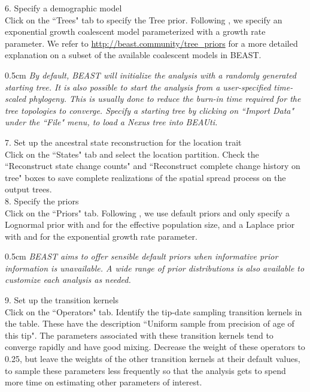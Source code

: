 \documentclass{article}
\newcommand{\ann}[1]{
\begin{adjustwidth}{0.5cm}{}
\it{#1}\\
\end{adjustwidth}}
\newcommand{\code}[1]{
{\upshape\ttfamily{#1}}}
\begin{document}
6. Specify a demographic model\\

Click on the ``Trees" tab to specify the Tree prior. Following \cite{travhist}, %
we specify an exponential growth coalescent model parameterized with a growth rate parameter.
We refer to \url{http://beast.community/tree_priors} for a more detailed explanation on a subset of the available coalescent models in BEAST. \\

\ann{By default, BEAST will initialize the analysis with a randomly generated starting tree. It is also possible to start the analysis from a user-specified time-scaled phylogeny. This is usually done to reduce the burn-in time required for the tree topologies to converge. Specify a starting tree by clicking on ``Import Data" under the ``File" menu, to load a Nexus tree into BEAUti.}

7. Set up the ancestral state reconstruction for the location trait\\

Click on the ``States" tab and select the location partition. Check the ``Reconstruct state change counts" and ``Reconstruct complete change history on tree" boxes to save complete realizations of the spatial spread process on the output trees.\\

8. Specify the priors \\

Click on the ``Priors" tab. Following \cite{travhist}, %
we use default priors and only specify a Lognormal prior with \code{mu=0} and \code{sigma=10} for the effective population size, and a Laplace prior with \code{mean=0} and \code{scale=100} for the exponential growth rate parameter.\\

\ann{BEAST aims to offer sensible default priors when informative prior information is unavailable. A wide range of prior distributions is also available to customize each analysis as needed.}

9. Set up the transition kernels \\

Click on the ``Operators" tab. Identify the tip-date sampling transition kernels in the table.
These have the description ``Uniform sample from precision of age of this tip".
The parameters associated with these transition kernels tend to converge rapidly and have good mixing.
Decrease the weight of these operators to 0.25, but leave the weights of the other transition kernels at their default values, to sample these parameters less frequently so that the analysis gets to spend more time on estimating other parameters of interest.\\
\end{document}
